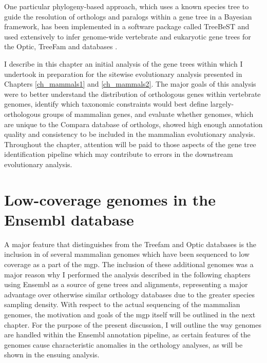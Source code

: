 One particular phylogeny-based approach, which uses a known species
tree to guide the resolution of orthologs and paralogs within a gene
tree in a Bayesian framework, has been implemented in a software
package called TreeBeST and used extensively to infer genome-wide
vertebrate and eukaryotic gene trees for the Optic, TreeFam and \cmp
databases \citep{Heger2008,Ruan2008,Vilella2009}.

I describe in this chapter an initial analysis of the gene trees
within \cmp which I undertook in preparation for the sitewise
evolutionary analysis presented in Chapters \ref{ch_mammals1} and
\ref{ch_mammals2}. The major goals of this analysis were to better
understand the distribution of orthologous genes within vertebrate
genomes, identify which taxonomic constraints would best define
largely-orthologous groups of mammalian genes, and evaluate whether
\lcv genomes, which are unique to the Compara database of
orthologs, showed high enough annotation quality and consistency to be
included in the mammalian evolutionary analysis. Throughout the
chapter, attention will be paid to those aspects of the gene tree
identification pipeline which may contribute to errors in the
downstream evolutionary analysis.

\section{Low-coverage genomes in the Ensembl database}

A major feature that distinguishes \cmp from the Treefam and Optic
databases is the inclusion in \cmp of several mammalian genomes which
have been sequenced to low coverage as a part of the \ac{mgp}. The
inclusion of these additional genomes was a major reason why I
performed the analysis described in the following chapters using
Ensembl as a source of gene trees and alignments, representing a major
advantage over otherwise similar orthology databases due to the
greater species sampling density. With respect to the actual
sequencing of the \lcv mammalian genomes, the motivation and goals of
the \ac{mgp} itself will be outlined in the next chapter. For the
purpose of the present discussion, I will outline the way \lcv genomes
are handled within the Ensembl annotation pipeline, as certain
features of the \lcv genomes cause characteristic anomalies in the
orthology analyses, as will be shown in the ensuing analysis.

